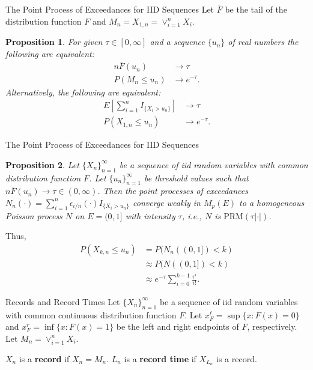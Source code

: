 \documentclass{beamer}
\newcommand{\PRM}{\text{PRM}}
\newtheorem{proposition}{Proposition}
\begin{document}
\begin{frame}{The Point Process of Exceedances for IID Sequences}
    Let $\bar{F}$ be the tail of the distribution function $F$ and $M_n = X_{1, n} = \vee_{i = 1}^n X_i$.
    \begin{proposition}
        For given $\tau \in [0, \infty]$ and a sequence $\{u_n\}$ of real numbers the following are equivalent:
        \begin{align*}
            n\bar{F}(u_n) &\to \tau \\
            P(M_n \le u_n) &\to e^{-\tau}.
        \end{align*}
        Alternatively, the following are equivalent:
        \begin{align*}
            E\left[\sum_{i = 1}^n I_{\{X_i > u_n\}}\right] &\to \tau \\
            P(X_{1, n} \le u_n) &\to e^{-\tau}.
        \end{align*}
    \end{proposition}
\end{frame}

\begin{frame}{The Point Process of Exceedances for IID Sequences}
    \begin{proposition}
        Let $\{X_n\}_{n = 1}^{\infty}$ be a sequence of iid random variables with common distribution function $F$. Let $\{u_n\}_{n = 1}^{\infty}$ be threshold values such that $n\bar{F}(u_n) \to \tau \in (0, \infty)$. Then the point processes of exceedances $N_n(\cdot) = \sum_{i = 1}^n \epsilon_{i / n}(\cdot)I_{\{X_i > u_n\}}$ converge weakly in $M_p(E)$ to a homogeneous Poisson process $N$ on $E = (0, 1]$ with intensity $\tau$, i.e., $N$ is $\PRM(\tau|\cdot|)$.
    \end{proposition}

    Thus,
    \begin{align*}
        P(X_{k, n} \le u_n) &= P(N_n((0, 1]) < k) \\
        &\approx P(N((0, 1]) < k) \\
        &\approx e^{-\tau}\sum_{i = 0}^{k - 1} \frac{\tau^i}{i!}.
    \end{align*}
\end{frame}

\begin{frame}{Records and Record Times}
    Let $\{X_n\}_{n = 1}^{\infty}$ be a sequence of iid random variables with common continuous distribution function $F$. Let $x_F^{\ell} = \sup\{x : F(x) = 0\}$ and $x_F^r = \inf\{x : F(x) = 1\}$ be the left and right endpoints of $F$, respectively. Let $M_n = \vee_{i = 1}^n X_i$.

    \smallskip

    $X_n$ is a \textbf{record} if $X_n = M_n$. $L_n$ is a \textbf{record time} if $X_{L_n}$ is a record.
\end{frame}
\end{document}
